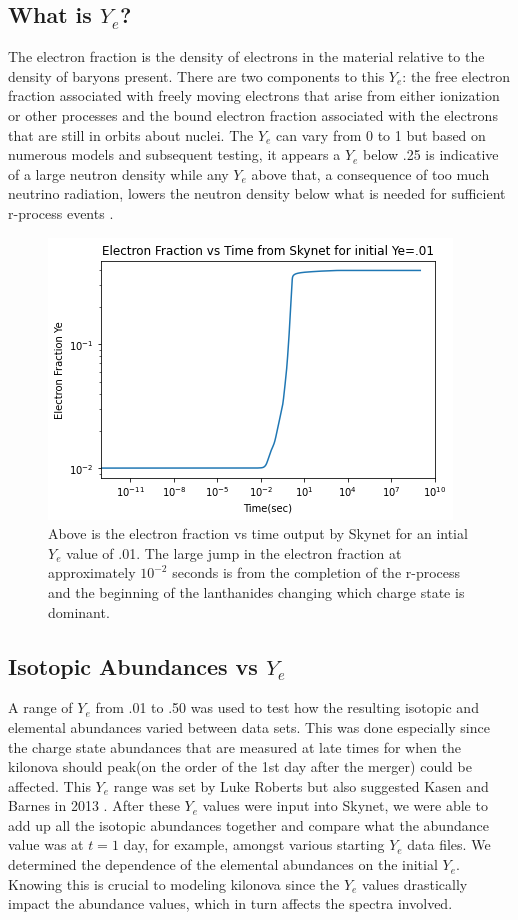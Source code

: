 \documentclass[11pt,a4paper]{article}
\begin{document}
\subsection{What is $Y_e$?}

The electron fraction is the density of electrons in the material relative to the density of baryons present. There are two components to this $Y_e$: the free electron fraction associated with freely moving electrons that arise from either ionization or other processes and the bound electron fraction associated with the electrons that are still in orbits about nuclei. The $Y_e$ can vary from 0 to 1 but based on numerous models and subsequent testing, it appears a $Y_e$ below .25 is indicative of a large neutron density while any $Y_e$ above that, a consequence of too much neutrino radiation, lowers the neutron density below what is needed for sufficient r-process events \cite{Radice_2018} . 


\begin{figure}[h!]
  \includegraphics[scale = .75]{Ye_time.png}
  \centering
  \caption{Above is the electron fraction vs time output by Skynet for an intial $Y_e$ value of .01. The large jump in the electron fraction at approximately $10^{-2}$ seconds is from the completion of the r-process and the beginning of the lanthanides changing which charge state is dominant. }
\end{figure}


\subsection{Isotopic Abundances vs $Y_e$}

A range of $Y_e$ from .01 to .50 was used to test how the resulting isotopic and elemental abundances varied between data sets. This was done especially since the charge state abundances that are measured at late times for when the kilonova should peak(on the order of the 1st day after the merger) could be affected. This $Y_e$ range was set by Luke Roberts but also suggested Kasen and Barnes in 2013 \cite{Barnes_Kasen_2013} .
After these $Y_e$ values were input into Skynet, we were able to add up all the isotopic abundances together and compare what the abundance value was at $t = 1$ day, for example, amongst various starting $Y_e$ data files. We determined the dependence of the elemental abundances on the initial $Y_e$. Knowing this is crucial to modeling kilonova since the $Y_e$ values drastically impact the abundance values, which in turn affects the spectra involved.
\end{document}
